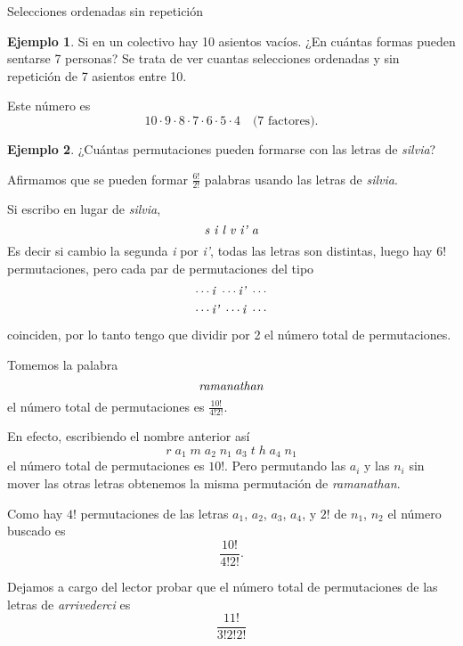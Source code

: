 \documentclass[11pt,spanish,makeidx]{amsbook}
\theoremstyle{definition}
\newtheorem{ejemplo}{Ejemplo}[section]
\theoremstyle{remark}
\begin{document}
\begin{section}{Selecciones ordenadas sin repetición}
\begin{ejemplo}
Si en un colectivo hay 10 asientos vacíos. ¿En cuántas formas pueden sentarse 7 personas? Se trata de ver cuantas selecciones ordenadas y sin repetición de 7 asientos entre 10. 

Este número es
$$
10 \cdot 9 \cdot 8 \cdot 7 \cdot 6 \cdot 5 \cdot 4 \quad \text{(7 factores).}
$$
\end{ejemplo}

\begin{ejemplo}
¿Cuántas permutaciones pueden formarse con las letras de
{\em silvia}?

Afirmamos que se pueden formar  $\displaystyle{\frac{6!}{2!}}$ palabras usando las letras de {\em silvia}.

Si escribo en lugar de {\em silvia},
$$
\text{\em s i l v i' a}
$$
Es decir si cambio la segunda {\em i } por {\em i'}, todas las letras son distintas, luego hay $6!$ permutaciones, pero cada par de permutaciones del tipo
\begin{align*}
\cdots \text{\em i } \cdots  \text{\em i' }  \cdots \\
\cdots \text{\em i' } \cdots  \text{\em i } \cdots
\end{align*}
coinciden, por lo tanto tengo que dividir por 2 el número total de permutaciones.

Tomemos la palabra
$$
\text{\em ramanathan}
$$
el número total de permutaciones es $\displaystyle{\frac{10!}{ 4!2!}}$.

En efecto, escribiendo el nombre anterior así 
$$
r\;a_1\;m\;a_2\;n_1\;a_3\;t\;h\;a_4\;n_1
$$
el número total de permutaciones es $10!$. Pero permutando las $a_i$ y las $n_i$ sin mover las otras letras obtenemos la misma permutación de {\em ramanathan}.

Como hay $4!$ permutaciones de las letras $a_1$, $a_2$, $a_3$, $a_4$, y $2!$ de $n_1$, $n_2$ el número buscado es 
$$
\frac{10!}{ 4!2!}.
$$

Dejamos a cargo del lector probar que el número total de permutaciones de las letras de {\em arrivederci} es
$$
\frac{11!}{3!  2!  2!}
$$
\end{ejemplo}

\end{section}
\end{document}
